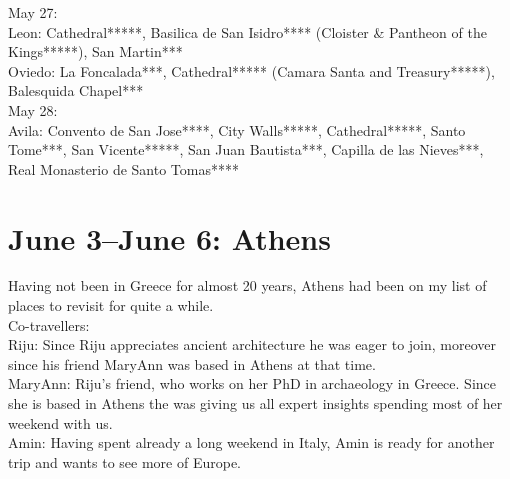 May 27:\\
Leon: Cathedral*****, Basilica de San Isidro**** (Cloister \& Pantheon of the Kings*****), San Martin***\\
Oviedo: La Foncalada***, Cathedral***** (Camara Santa and Treasury*****), Balesquida Chapel***\\

May 28:\\
Avila: Convento de San Jose****, City Walls*****, Cathedral*****, Santo Tome***, San Vicente*****, San Juan Bautista***, Capilla de las Nieves***, Real Monasterio de Santo Tomas****

\section{June 3--June 6: Athens}
\label{2017Athens}

Having not been in Greece for almost 20 years, Athens had been on my list of places to revisit for quite a while. \\

Co-travellers:\\
Riju: Since Riju appreciates ancient architecture he was eager to join, moreover since his friend MaryAnn was based in Athens at that time.\\
MaryAnn: Riju's friend, who works on her PhD in archaeology in Greece. Since she is based in Athens the was giving us all expert insights spending most of her weekend with us.\\
Amin: Having spent already a long weekend in Italy, Amin is ready for another trip and wants to see more of Europe.\\

